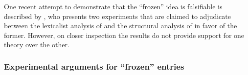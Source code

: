

One recent attempt to demonstrate that the ``frozen'' idea is falsifiable is described by \cite{fadlon12}, who presents two experiments that are claimed to adjudicate between the lexicalist analysis of \cite{reinhartsiloni05} and the structural analysis of \cite{arad05} in favor of the former. However, on closer inspection the results do not provide support for one theory over the other.

		\subsubsection{Experimental arguments for ``frozen'' entries \citep{fadlon12}}  
